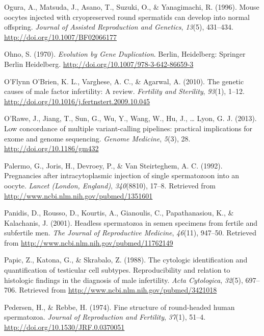 \documentclass[12pt,twoside]{reedthesis}
\theoremstyle{definition}
\theoremstyle{definition}
\theoremstyle{remark}
\begin{document}
  \hypertarget{ref-Kimura1995}{}
  Ogura, A., Matsuda, J., Asano, T., Suzuki, O., \& Yanagimachi, R.
  (1996). Mouse oocytes injected with cryopreserved round spermatids can
  develop into normal offspring. \emph{Journal of Assisted Reproduction
  and Genetics}, \emph{13}(5), 431--434.
  \url{http://doi.org/10.1007/BF02066177}
  
  \hypertarget{ref-Ohno1970}{}
  Ohno, S. (1970). \emph{Evolution by Gene Duplication}. Berlin,
  Heidelberg: Springer Berlin Heidelberg.
  \url{http://doi.org/10.1007/978-3-642-86659-3}
  
  \hypertarget{ref-OFlynnOBrien2010}{}
  O'Flynn O'Brien, K. L., Varghese, A. C., \& Agarwal, A. (2010). The
  genetic causes of male factor infertility: A review. \emph{Fertility and
  Sterility}, \emph{93}(1), 1--12.
  \url{http://doi.org/10.1016/j.fertnstert.2009.10.045}
  
  \hypertarget{ref-ORawe2013}{}
  O'Rawe, J., Jiang, T., Sun, G., Wu, Y., Wang, W., Hu, J., \ldots{} Lyon,
  G. J. (2013). Low concordance of multiple variant-calling pipelines:
  practical implications for exome and genome sequencing. \emph{Genome
  Medicine}, \emph{5}(3), 28. \url{http://doi.org/10.1186/gm432}
  
  \hypertarget{ref-Palermo1992}{}
  Palermo, G., Joris, H., Devroey, P., \& Van Steirteghem, A. C. (1992).
  Pregnancies after intracytoplasmic injection of single spermatozoon into
  an oocyte. \emph{Lancet (London, England)}, \emph{340}(8810), 17--8.
  Retrieved from \url{http://www.ncbi.nlm.nih.gov/pubmed/1351601}
  
  \hypertarget{ref-Panidis2001}{}
  Panidis, D., Rousso, D., Kourtis, A., Gianoulis, C., Papathanasiou, K.,
  \& Kalachanis, J. (2001). Headless spermatozoa in semen specimens from
  fertile and subfertile men. \emph{The Journal of Reproductive Medicine},
  \emph{46}(11), 947--50. Retrieved from
  \url{http://www.ncbi.nlm.nih.gov/pubmed/11762149}
  
  \hypertarget{ref-Papic}{}
  Papic, Z., Katona, G., \& Skrabalo, Z. (1988). The cytologic
  identification and quantification of testicular cell subtypes.
  Reproducibility and relation to histologic findings in the diagnosis of
  male infertility. \emph{Acta Cytologica}, \emph{32}(5), 697--706.
  Retrieved from \url{http://www.ncbi.nlm.nih.gov/pubmed/3421018}
  
  \hypertarget{ref-Pedersen1974}{}
  Pedersen, H., \& Rebbe, H. (1974). Fine structure of round-headed human
  spermatozoa. \emph{Journal of Reproduction and Fertility}, \emph{37}(1),
  51--4. \url{http://doi.org/10.1530/JRF.0.0370051}
  
\end{document}
